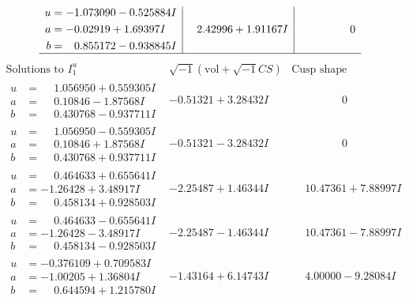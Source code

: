 \documentclass[1p]{elsarticle_modified}
\theoremstyle{definition}
\newcommand{\I}{\sqrt{-1}}
\begin{document}
$$\begin{array}{c|c|c}
\begin{aligned}
u &= -1.073090 - 0.525884 I \\
a &= -0.02919 + 1.69397 I \\
b &= \phantom{-}0.855172 - 0.938845 I\end{aligned}
 & \phantom{-}2.42996 + 1.91167 I & \phantom{-0.000000 } 0\\
 \hline 
 \end{array}$$\newpage$$\begin{array}{c|c|c}  
\text{Solutions to }I^u_{1}& \I (\text{vol} + \sqrt{-1}CS) & \text{Cusp shape}\\
 \hline 
\begin{aligned}
u &= \phantom{-}1.056950 + 0.559305 I \\
a &= \phantom{-}0.10846 - 1.87568 I \\
b &= \phantom{-}0.430768 - 0.937711 I\end{aligned}
 & -0.51321 + 3.28432 I & \phantom{-0.000000 } 0 \\ \hline\begin{aligned}
u &= \phantom{-}1.056950 - 0.559305 I \\
a &= \phantom{-}0.10846 + 1.87568 I \\
b &= \phantom{-}0.430768 + 0.937711 I\end{aligned}
 & -0.51321 - 3.28432 I & \phantom{-0.000000 } 0 \\ \hline\begin{aligned}
u &= \phantom{-}0.464633 + 0.655641 I \\
a &= -1.26428 + 3.48917 I \\
b &= \phantom{-}0.458134 + 0.928503 I\end{aligned}
 & -2.25487 + 1.46344 I & \phantom{-}10.47361 + 7.88997 I \\ \hline\begin{aligned}
u &= \phantom{-}0.464633 - 0.655641 I \\
a &= -1.26428 - 3.48917 I \\
b &= \phantom{-}0.458134 - 0.928503 I\end{aligned}
 & -2.25487 - 1.46344 I & \phantom{-}10.47361 - 7.88997 I \\ \hline\begin{aligned}
u &= -0.376109 + 0.709583 I \\
a &= -1.00205 + 1.36804 I \\
b &= \phantom{-}0.644594 + 1.215780 I\end{aligned}
 & -1.43164 + 6.14743 I & \phantom{-}4.00000 - 9.28084 I \\ \hline\begin{aligned}

\end{aligned}
\end{array}$$
\end{document}

